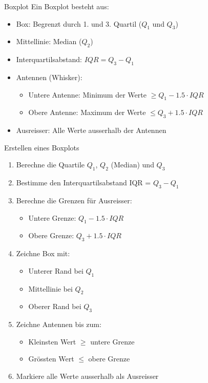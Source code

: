 \begin{definition}{Boxplot}
Ein Boxplot besteht aus:
\begin{itemize}
    \item Box: Begrenzt durch 1. und 3. Quartil ($Q_1$ und $Q_3$)
    \item Mittellinie: Median ($Q_2$)
    \item Interquartilsabstand: $IQR = Q_3 - Q_1$
    \item Antennen (Whisker):
    \begin{itemize}
        \item Untere Antenne: Minimum der Werte $\geq Q_1 - 1.5 \cdot IQR$
        \item Obere Antenne: Maximum der Werte $\leq Q_3 + 1.5 \cdot IQR$
    \end{itemize}
    \item Ausreisser: Alle Werte ausserhalb der Antennen
\end{itemize}
\end{definition}

\begin{KR}{Erstellen eines Boxplots}
\begin{enumerate}
    \item Berechne die Quartile $Q_1$, $Q_2$ (Median) und $Q_3$
    \item Bestimme den Interquartilsabstand IQR = $Q_3 - Q_1$
    \item Berechne die Grenzen für Ausreisser:
        \begin{itemize}
            \item Untere Grenze: $Q_1 - 1.5 \cdot IQR$
            \item Obere Grenze: $Q_3 + 1.5 \cdot IQR$
        \end{itemize}
    \item Zeichne Box mit:
        \begin{itemize}
            \item Unterer Rand bei $Q_1$
            \item Mittellinie bei $Q_2$
            \item Oberer Rand bei $Q_3$
        \end{itemize}
    \item Zeichne Antennen bis zum:
        \begin{itemize}
            \item Kleinsten Wert  $\geqslant$  untere Grenze
            \item Grössten Wert $\leqslant$  obere Grenze
        \end{itemize}
    \item Markiere alle Werte ausserhalb als Ausreisser
\end{enumerate}
\end{KR}

